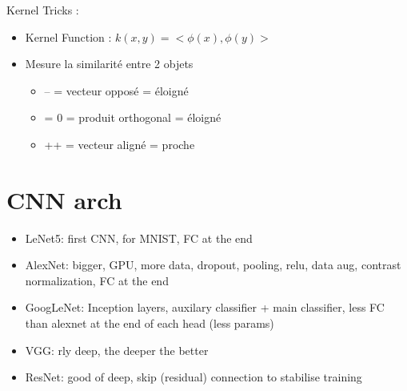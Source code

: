 \documentclass{article}
\theoremstyle{plain}%
\theoremstyle{definition}
\theoremstyle{remark}
\begin{document}
Kernel Tricks :
\begin{itemize}
    \item Kernel Function : $ k(x,y) = <\phi (x), \phi(y)> $
    \item Mesure la similarité entre 2 objets \begin{itemize}
        \item -- = vecteur opposé = éloigné
        \item = 0 = produit orthogonal = éloigné
        \item ++ = vecteur aligné = proche
    \end{itemize}
\end{itemize}



\section{CNN arch}
\begin{itemize}
    \item LeNet5: first CNN, for MNIST, FC at the end
    \item AlexNet: bigger, GPU, more data, dropout, pooling, relu, data aug, contrast normalization, FC at the end
    \item GoogLeNet: Inception layers, auxilary classifier + main classifier, less FC than alexnet at the end of each head (less params) 
    \item VGG: rly deep, the deeper the better
    \item ResNet: good of deep, skip (residual) connection to stabilise training
\end{itemize}
\end{document}
